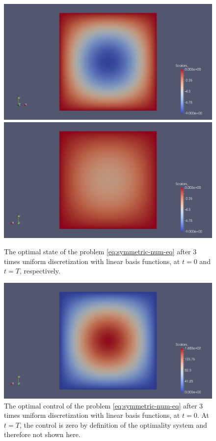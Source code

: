 \documentclass[../thesis.tex]{subfiles}
\begin{document}
\begin{figure}[htpb]
\centering
\includegraphics[width=\textwidth]{Images/symm-3r-y-0t.png}
\includegraphics[width=\textwidth]{Images/symm-3r-y-Tt.png}
\caption{The optimal state of the problem \cref{eq:symmetric-num-eq} after 3 times uniform discretization with linear basis functions, at $t = 0$ and $t = T$, respectively.}
\label{fig:symm-3r-y}
\end{figure}
\begin{figure}[htpb]
\centering
\includegraphics[width=\textwidth]{Images/symm-3r-u-0t.png}
\caption{The optimal control of the problem \cref{eq:symmetric-num-eq} after 3 times uniform discretization with linear basis functions, at $t = 0$. At $t = T$, the control is zero by definition of the optimality system and therefore not shown here.}
\label{fig:symm-3r-u}
\end{figure}
\end{document}
